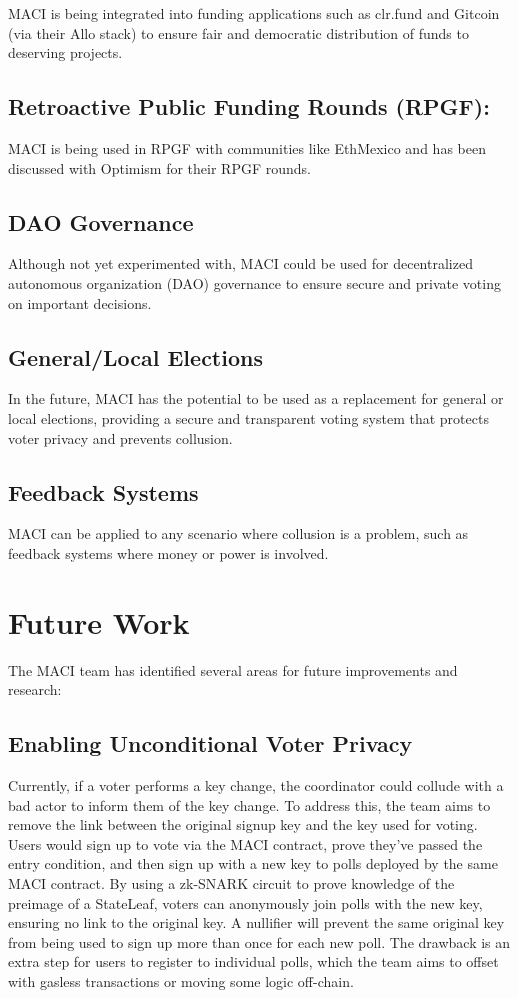 \documentclass[11pt]{article}
\begin{document}
MACI is being integrated into funding applications such as clr.fund and Gitcoin (via their Allo stack) to ensure fair and democratic distribution of funds to deserving projects.
\subsection{Retroactive Public Funding Rounds (RPGF):}
\label{sec:org4a9a349}

MACI is being used in RPGF with communities like EthMexico and has been discussed with Optimism for their RPGF rounds.
\subsection{DAO Governance}
\label{sec:org90563f6}

Although not yet experimented with, MACI could be used for decentralized autonomous organization (DAO) governance to ensure secure and private voting on important decisions.
\subsection{General/Local Elections}
\label{sec:orgde56561}

In the future, MACI has the potential to be used as a replacement for general or local elections, providing a secure and transparent voting system that protects voter privacy and prevents collusion.
\subsection{Feedback Systems}
\label{sec:org2c3a3f0}

MACI can be applied to any scenario where collusion is a problem, such as feedback systems where money or power is involved.
\section{Future Work}
\label{sec:org77cddf0}

The MACI team has identified several areas for future improvements and research:
\subsection{Enabling Unconditional Voter Privacy}
\label{sec:org453575c}

Currently, if a voter performs a key change, the coordinator could collude with a bad actor to inform them of the key change. To address this, the team aims to remove the link between the original signup key and the key used for voting. Users would sign up to vote via the MACI contract, prove they've passed the entry condition, and then sign up with a new key to polls deployed by the same MACI contract. By using a zk-SNARK circuit to prove knowledge of the preimage of a StateLeaf, voters can anonymously join polls with the new key, ensuring no link to the original key. A nullifier will prevent the same original key from being used to sign up more than once for each new poll. The drawback is an extra step for users to register to individual polls, which the team aims to offset with gasless transactions or moving some logic off-chain.
\end{document}
